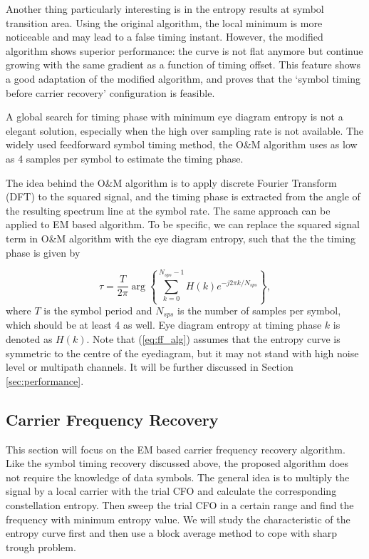 \documentclass[journal,comsoc]{IEEEtran}
\begin{document}
Another thing particularly interesting is in the entropy results at symbol transition area.
Using the original algorithm, the local minimum is more noticeable and may lead to a false timing instant.
However, the modified algorithm shows superior performance:
the curve is not flat anymore but continue growing with the same gradient as a function of timing offset.
This feature shows a good adaptation of the modified algorithm, and proves that the `symbol timing before carrier recovery' configuration is feasible.

A global search for timing phase with minimum eye diagram entropy is not a elegant solution, especially when the high over sampling rate is not available.
The widely used feedforward symbol timing method, the O\&M algorithm uses as low as 4 samples per symbol to estimate the timing phase.

The idea behind the O\&M algorithm is to apply discrete Fourier Transform (DFT) to the squared signal,
and the timing phase is extracted from the angle of the resulting spectrum line at the symbol rate.
The same approach can be applied to EM based algorithm.
To be specific, we can replace the squared signal term in O\&M algorithm with the eye diagram entropy,
such that the the timing phase is given by

\begin{equation}
\tau  = \frac{T}{{2\pi }}\arg \left\{ {\sum\limits_{k = 0}^{N_{sps}-1} {H(k){e^{ - j2\pi k/N_{sps}}}} } \right\},
\label{eq:ff_alg}
\end{equation}
where \(T\) is the symbol period and \(N_{sps}\) is the number of samples per symbol, which should be at least 4 as well.
Eye diagram entropy at timing phase \(k\) is denoted as \(H(k)\).
Note that (\ref{eq:ff_alg}) assumes that the entropy curve is symmetric to the centre of the eyediagram,
but it may not stand with high noise level or multipath channels.
It will be further discussed in Section \ref{sec:performance}.

\subsection{Carrier Frequency Recovery}
This section will focus on the EM based carrier frequency recovery algorithm.
Like the symbol timing recovery discussed above, the proposed algorithm does not require the knowledge of data symbols.
The general idea is to multiply the signal by a local carrier with the trial CFO and calculate the corresponding constellation entropy.
Then sweep the trial CFO in a certain range and find the frequency with minimum entropy value.
We will study the characteristic of the entropy curve first and then use a block average method to cope with sharp trough problem.
\end{document}
